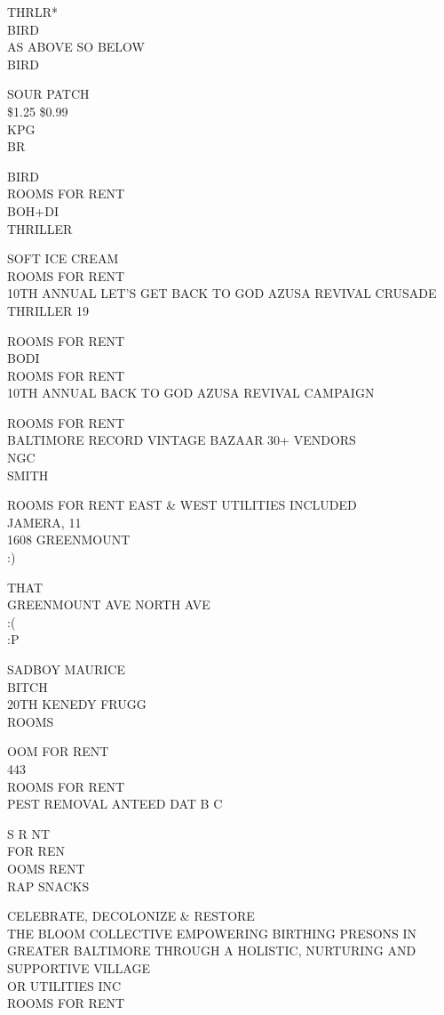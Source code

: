 \documentclass[10pt,letterpaper]{article}
\begin{document}
THRLR*\\
BIRD\\
AS ABOVE SO BELOW\\
BIRD

SOUR PATCH\\
\$1.25 \$0.99\\
KPG\\
BR

BIRD\\
ROOMS FOR RENT\\
BOH+DI\\
THRILLER

SOFT ICE CREAM\\
ROOMS FOR RENT\\
10TH ANNUAL LET'S GET BACK TO GOD AZUSA REVIVAL CRUSADE\\
THRILLER 19

ROOMS FOR RENT\\
BODI\\
ROOMS FOR RENT\\
10TH ANNUAL BACK TO GOD AZUSA REVIVAL CAMPAIGN

ROOMS FOR RENT\\
BALTIMORE RECORD VINTAGE BAZAAR 30+ VENDORS\\
NGC\\
SMITH

ROOMS FOR RENT EAST \& WEST UTILITIES INCLUDED\\
JAMERA, 11\\
1608 GREENMOUNT\\
:)

THAT\\
GREENMOUNT AVE NORTH AVE\\
:(\\
:P

SADBOY MAURICE\\
BITCH\\
20TH KENEDY FRUGG\\
ROOMS

OOM FOR RENT\\
443\\
ROOMS FOR RENT\\
PEST REMOVAL ANTEED DAT B C

S R NT\\
FOR REN\\
OOMS RENT\\
RAP SNACKS

CELEBRATE, DECOLONIZE \& RESTORE\\
THE BLOOM COLLECTIVE EMPOWERING BIRTHING PRESONS IN GREATER BALTIMORE THROUGH A HOLISTIC, NURTURING AND SUPPORTIVE VILLAGE\\
OR UTILITIES INC\\
ROOMS FOR RENT
\end{document}

